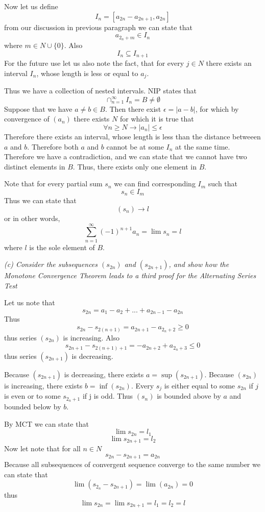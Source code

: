 \documentclass[11pt,oneside,titlepage]{book}
\begin{document}
Now let us define
$$I_n = [a_{2n} - a_{2n + 1}, a_{2n}]$$
from our discussion in previous paragraph we can state that
$$a_{2_n + m} \in I_n$$
where $m \in N \cup \{0\}$. Also
$$I_n \subseteq I_{n+1}$$
For the future use let us also note the fact, that for every $j \in N$ there
exists an interval $I_n$, whose length is less or equal to $a_j$.

Thus we have a collection of nested intervals. NIP states that
$$\cap_{n = 1}^{\infty} I_n = B \neq \emptyset$$
Suppose that we have $a \neq b \in B$. Then there exist $\epsilon = |a - b|$,
for which by convergence of $(a_n)$ there exists $N$ for which it is true that
$$\forall n \geq N \to |a_n| \leq \epsilon$$
Therefore there exists  an interval, whose length is less than the distance
betweeen $a$ and $b$. Therefore both $a$ and $b$  cannot be at some $I_n$ at
the same time. Therefore  we have a contradiction, and we can state that we
cannot have two distinct elements in $B$. Thus,  there exists
only one element in $B$.

Note that for every partial sum $s_n$ we can find corresponding $I_m$ such that
$$s_n \in I_m$$
Thus we can state that
$$(s_n)\to l$$
or in other words, 
$$\sum_{n = 1}^{\infty} (-1)^{n + 1}a_n = \lim s_n = l$$
where $l$ is the sole element of $B$.

\textit{(c) Consider the subsequences $(s_{2n})$ and $(s_{2n + 1})$, and show
  how the Monotone Convergence Theorem leads to a third proof for the
  Alternating Series Test}

Let us note that
$$s_{2n} = a_1 - a_2 + ... + a_{2n - 1} - a_{2n}$$
Thus
$$s_{2n} - s_{2(n + 1)} = a_{2n + 1} - a_{2_n + 2} \geq 0$$
thus series $(s_{2n})$ is increasing. Also
$$s_{2n + 1 } - s_{2(n + 1) + 1} = - a_{2n + 2} + a_{2_n + 3} \leq 0$$
thus series $(s_{2n + 1})$ is decreasing.

Because $(s_{2n + 1})$ is decreasing, there exists $a = \sup(s_{2n + 1})$.
Because $(s_{2n})$ is increasing, there exists $b = \inf(s_{2n})$.
Every $s_j$ is either equal to some $s_{2n}$ if $j$ is even or to some
$s_{2_n + 1}$ if j is odd. Thus $(s_n)$ is bounded above by $a$ and bounded
below by $b$.

By MCT we can state that 
$$\lim s_{2n} = l_1$$
$$\lim s_{2n + 1} = l_2 $$
Now let note that for all $n \in N$
$$s_{2n} - s_{2n + 1} = a_{2n}$$
Because all subsequences of convergent sequence converge to the same number
we can state that 
$$\lim(s_{2_n} - s_{2n + 1}) = \lim(a_{2n}) = 0$$
thus
$$\lim s_{2n} = \lim s_{2n + 1} = l_1 = l_2 = l$$
\end{document}
